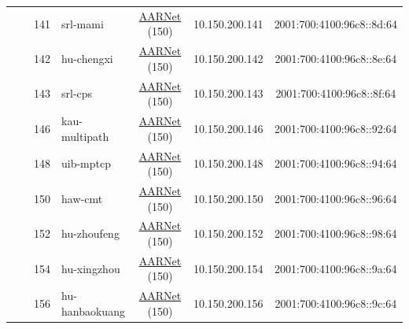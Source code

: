 \begin{small}
\begin{center}
\begin{longtable}{|c|c|c|c|c|c|c|c|}
  &  & \tiny{141} & \multicolumn{1}{|l|}{\tiny{srl-mami}} & \multicolumn{2}{|c|}{\tiny{\href{https://www.aarnet.edu.au/}{AARNet} (150)}} & \tiny{10.150.200.141} & \tiny{2001:700:4100:96c8::8d:64} \\* \cline{3-3}\cline{4-4}\cline{5-5}\cline{6-6}\cline{7-7}\cline{8-8}
  &  & \tiny{142} & \multicolumn{1}{|l|}{\tiny{hu-chengxi}} & \multicolumn{2}{|c|}{\tiny{\href{https://www.aarnet.edu.au/}{AARNet} (150)}} & \tiny{10.150.200.142} & \tiny{2001:700:4100:96c8::8e:64} \\* \cline{3-3}\cline{4-4}\cline{5-5}\cline{6-6}\cline{7-7}\cline{8-8}
  &  & \tiny{143} & \multicolumn{1}{|l|}{\tiny{srl-cps}} & \multicolumn{2}{|c|}{\tiny{\href{https://www.aarnet.edu.au/}{AARNet} (150)}} & \tiny{10.150.200.143} & \tiny{2001:700:4100:96c8::8f:64} \\* \cline{3-3}\cline{4-4}\cline{5-5}\cline{6-6}\cline{7-7}\cline{8-8}
  &  & \tiny{146} & \multicolumn{1}{|l|}{\tiny{kau-multipath}} & \multicolumn{2}{|c|}{\tiny{\href{https://www.aarnet.edu.au/}{AARNet} (150)}} & \tiny{10.150.200.146} & \tiny{2001:700:4100:96c8::92:64} \\* \cline{3-3}\cline{4-4}\cline{5-5}\cline{6-6}\cline{7-7}\cline{8-8}
  &  & \tiny{148} & \multicolumn{1}{|l|}{\tiny{uib-mptcp}} & \multicolumn{2}{|c|}{\tiny{\href{https://www.aarnet.edu.au/}{AARNet} (150)}} & \tiny{10.150.200.148} & \tiny{2001:700:4100:96c8::94:64} \\* \cline{3-3}\cline{4-4}\cline{5-5}\cline{6-6}\cline{7-7}\cline{8-8}
  &  & \tiny{150} & \multicolumn{1}{|l|}{\tiny{haw-cmt}} & \multicolumn{2}{|c|}{\tiny{\href{https://www.aarnet.edu.au/}{AARNet} (150)}} & \tiny{10.150.200.150} & \tiny{2001:700:4100:96c8::96:64} \\* \cline{3-3}\cline{4-4}\cline{5-5}\cline{6-6}\cline{7-7}\cline{8-8}
  &  & \tiny{152} & \multicolumn{1}{|l|}{\tiny{hu-zhoufeng}} & \multicolumn{2}{|c|}{\tiny{\href{https://www.aarnet.edu.au/}{AARNet} (150)}} & \tiny{10.150.200.152} & \tiny{2001:700:4100:96c8::98:64} \\* \cline{3-3}\cline{4-4}\cline{5-5}\cline{6-6}\cline{7-7}\cline{8-8}
  &  & \tiny{154} & \multicolumn{1}{|l|}{\tiny{hu-xingzhou}} & \multicolumn{2}{|c|}{\tiny{\href{https://www.aarnet.edu.au/}{AARNet} (150)}} & \tiny{10.150.200.154} & \tiny{2001:700:4100:96c8::9a:64} \\* \cline{3-3}\cline{4-4}\cline{5-5}\cline{6-6}\cline{7-7}\cline{8-8}
  &  & \tiny{156} & \multicolumn{1}{|l|}{\tiny{hu-hanbaokuang}} & \multicolumn{2}{|c|}{\tiny{\href{https://www.aarnet.edu.au/}{AARNet} (150)}} & \tiny{10.150.200.156} & \tiny{2001:700:4100:96c8::9c:64} \\* \cline{3-3}\cline{4-4}\cline{5-5}\cline{6-6}\cline{7-7}\cline{8-8}

\end{longtable}
\end{center}
\end{small}
